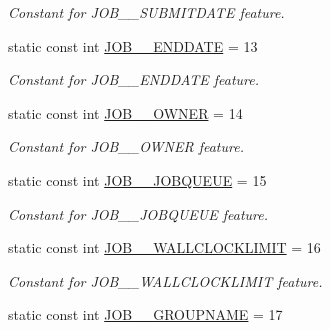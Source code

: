 \begin{DoxyCompactItemize}
\begin{DoxyCompactList}\small\item\em Constant for JOB\_\-\_\-SUBMITDATE feature. \item\end{DoxyCompactList}\item 
\hypertarget{classTMS__Data_1_1TMS__DataPackage_ac9cfd6cab5174accc6eb61cd01d5044f}{
static const int \hyperlink{classTMS__Data_1_1TMS__DataPackage_ac9cfd6cab5174accc6eb61cd01d5044f}{JOB\_\-\_\-ENDDATE} = 13}
\label{classTMS__Data_1_1TMS__DataPackage_ac9cfd6cab5174accc6eb61cd01d5044f}

\begin{DoxyCompactList}\small\item\em Constant for JOB\_\-\_\-ENDDATE feature. \item\end{DoxyCompactList}\item 
\hypertarget{classTMS__Data_1_1TMS__DataPackage_aea54f15a7f74e0f10ea7be1d84605d69}{
static const int \hyperlink{classTMS__Data_1_1TMS__DataPackage_aea54f15a7f74e0f10ea7be1d84605d69}{JOB\_\-\_\-OWNER} = 14}
\label{classTMS__Data_1_1TMS__DataPackage_aea54f15a7f74e0f10ea7be1d84605d69}

\begin{DoxyCompactList}\small\item\em Constant for JOB\_\-\_\-OWNER feature. \item\end{DoxyCompactList}\item 
\hypertarget{classTMS__Data_1_1TMS__DataPackage_a1c81a230f1ffaab8326984d7f7af663f}{
static const int \hyperlink{classTMS__Data_1_1TMS__DataPackage_a1c81a230f1ffaab8326984d7f7af663f}{JOB\_\-\_\-JOBQUEUE} = 15}
\label{classTMS__Data_1_1TMS__DataPackage_a1c81a230f1ffaab8326984d7f7af663f}

\begin{DoxyCompactList}\small\item\em Constant for JOB\_\-\_\-JOBQUEUE feature. \item\end{DoxyCompactList}\item 
\hypertarget{classTMS__Data_1_1TMS__DataPackage_a6ac6758a3af263fb136b8d35b2cbd6b6}{
static const int \hyperlink{classTMS__Data_1_1TMS__DataPackage_a6ac6758a3af263fb136b8d35b2cbd6b6}{JOB\_\-\_\-WALLCLOCKLIMIT} = 16}
\label{classTMS__Data_1_1TMS__DataPackage_a6ac6758a3af263fb136b8d35b2cbd6b6}

\begin{DoxyCompactList}\small\item\em Constant for JOB\_\-\_\-WALLCLOCKLIMIT feature. \item\end{DoxyCompactList}\item 
\hypertarget{classTMS__Data_1_1TMS__DataPackage_ab7745e16644a7eb2001fd0b250fed1d6}{
static const int \hyperlink{classTMS__Data_1_1TMS__DataPackage_ab7745e16644a7eb2001fd0b250fed1d6}{JOB\_\-\_\-GROUPNAME} = 17}
\label{classTMS__Data_1_1TMS__DataPackage_ab7745e16644a7eb2001fd0b250fed1d6}


\end{DoxyCompactItemize}
